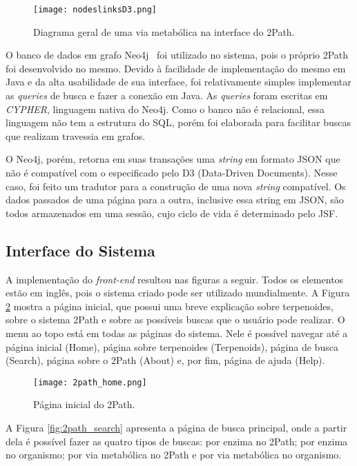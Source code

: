 \begin{figure}[!h]
    \centering
    \texttt{[image: nodeslinksD3.png]}
    \caption{Diagrama geral de uma via metabólica na interface do 2Path.}
    \label{fig:nodeslinksD3}
\end{figure}

\indent O banco de dados em grafo Neo4j~\cite{waldeyr} foi utilizado no sistema, pois o próprio 2Path foi desenvolvido no mesmo. Devido à facilidade de implementação do mesmo em Java e da alta usabilidade de sua interface, foi relativamente simples implementar as \textit{queries} de busca e fazer a conexão em Java. As \textit{queries} foram escritas em \textit{CYPHER}, linguagem nativa do Neo4j. Como o banco não é relacional, essa linguagem não tem a estrutura do SQL, porém foi elaborada para facilitar buscas que realizam travessia em grafos. 

\indent O Neo4j, porém, retorna em suas transações uma \textit{string} em formato JSON que não é compatível com o especificado pelo D3 (Data-Driven Documents). Nesse caso, foi feito um tradutor para a construção de uma nova \textit{string} compatível. Os dados passados de uma página para a outra, inclusive essa string em JSON, são todos armazenados em uma sessão, cujo ciclo de vida é determinado pelo JSF.

\subsection{Interface do Sistema}

\indent A implementação do \textit{front-end} resultou nas figuras a seguir. Todos os elementos estão em inglês, pois o sistema criado pode ser utilizado mundialmente. A Figura \ref{fig:2path_home} mostra a página inicial, que possui uma breve explicação sobre terpenoides, sobre o sistema 2Path e sobre as possíveis buscas que o usuário pode realizar. O menu ao topo está em todas as páginas do sistema. Nele é possível navegar até a página inicial (Home), página sobre terpenoides (Terpenoids), página de busca (Search), página sobre o 2Path (About) e, por fim, página de ajuda (Help).

\begin{figure}[!h]
    \centering
    \texttt{[image: 2path\_home.png]}
    \caption{Página inicial do 2Path.}
    \label{fig:2path_home}
\end{figure}

\indent A Figura \ref{fig:2path_search} apresenta a página de busca principal, onde a partir dela é possível fazer as quatro tipos de buscas: por enzima no 2Path; por enzima no organismo; por via metabólica no 2Path e por via metabólica no organismo.

